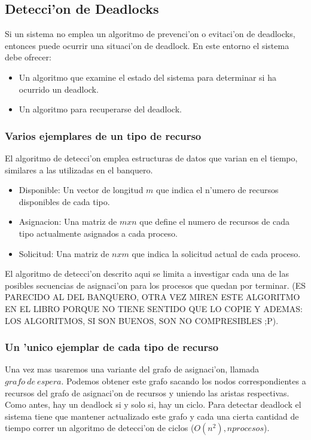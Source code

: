 \documentclass[a4paper,10pt]{article}
\begin{document}
\subsection{Detecci'on de Deadlocks}
Si un sistema no emplea un algoritmo de prevenci'on o evitaci'on de deadlocks, entonces puede ocurrir una situaci'on de deadlock. En este entorno el sistema debe ofrecer:
\begin{itemize}
 \item Un algoritmo que examine el estado del sistema para determinar si ha ocurrido un deadlock.
 \item Un algoritmo para recuperarse del deadlock.
\end{itemize}

\subsubsection{Varios ejemplares de un tipo de recurso}
El algoritmo de detecci'on emplea estructuras de datos que varian en el tiempo, similares a las utilizadas en el banquero.

\begin{itemize}
 \item Disponible: Un vector de longitud $m$ que indica el n'umero de recursos disponibles de cada tipo.
 \item Asignacion: Una matriz de $mxn$ que define el numero de recursos de cada tipo actualmente asignados a cada proceso.
 \item Solicitud: Una matriz de $nxm$ que indica la solicitud actual de cada proceso.
\end{itemize}
El algoritmo de detecci'on descrito aqui se limita a investigar cada una de las posibles secuencias de asignaci'on para los procesos que quedan por terminar. (ES PARECIDO AL DEL BANQUERO, OTRA VEZ MIREN ESTE ALGORITMO EN EL LIBRO PORQUE NO TIENE SENTIDO QUE LO COPIE Y ADEMAS: LOS ALGORITMOS, SI SON BUENOS, SON NO COMPRESIBLES ;P).

\subsubsection{Un 'unico ejemplar de cada tipo de recurso}
Una vez mas usaremos una variante del grafo de asignaci'on, llamada $grafo\ de\ espera$. Podemos obtener este grafo sacando los nodos correspondientes a recursos del grafo de asignaci'on de recursos y uniendo las aristas respectivas.
Como antes, hay un deadlock si y solo si, hay un ciclo. Para detectar deadlock el sistema tiene que mantener actualizado este grafo y cada una cierta cantidad de tiempo correr un algoritmo de detecci'on de ciclos ($O(n^{2}), n procesos$).
\end{document}
